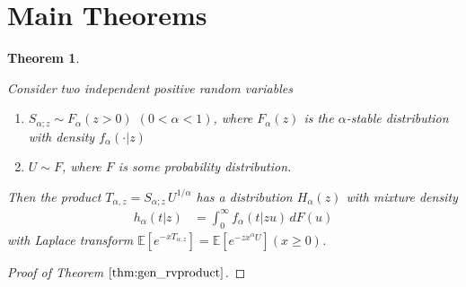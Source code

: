 \documentclass[a4paper,12pt]{article}
\newtheorem{theorem}{Theorem}
\begin{document}
{{\section{Main Theorems}
\label{sec:theorems}

 \begin{theorem}
\label{thm:gen_rvproduct}

Consider two  independent  positive random variables
\begin{enumerate}
\setlength{\itemsep}{0pt}
\item $S_{\alpha;z} \sim F_\alpha(z>0)$ $(0<\alpha<1)$,  where $F_\alpha(z)$ is  the  $\alpha$-stable distribution with density $f_\alpha(\cdot\vert z)$ 
\item $U \sim F$, where $F$ is  some probability  distribution. %
\end{enumerate}
Then the product $T_{\alpha,z}=S_{\alpha;z} \, U^{1/\alpha}$  has a distribution $H_\alpha(z)$ with mixture density
\begin{align}
h_\alpha(t \vert z)
&=  \int_0^\infty  f_\alpha(t \vert z u) \, dF(u)  %
\label{eq:gen_rvproduct_density}
\end{align}
with Laplace transform
 $\mathbb{E}\left[e^{-xT_{\alpha,z}}\right]=  \mathbb{E}\left[e^{-zx^\alpha U}\right]  (x\ge0)$. 
\end{theorem}
\begin{proof} [Proof of Theorem  $\ref{thm:gen_rvproduct}$]

\end{proof}}}
\end{document}
